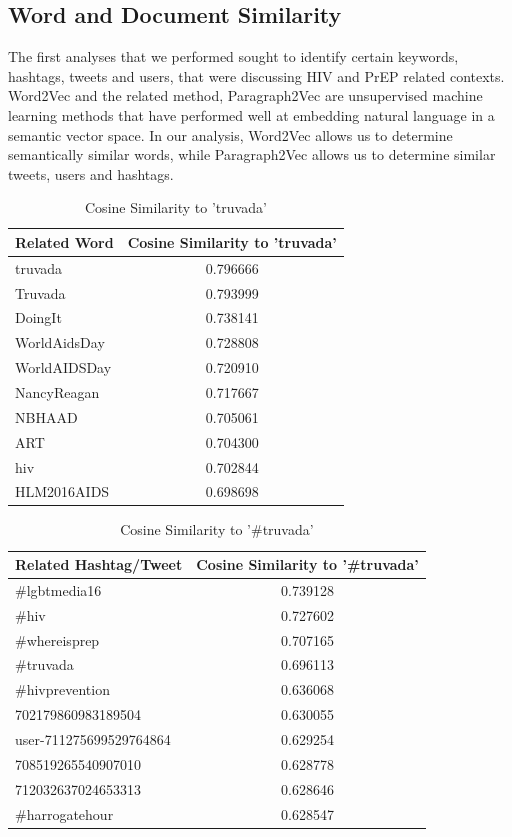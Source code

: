 \documentclass{sig-alternate-05-2015}
\begin{document}
\subsection{Word and Document Similarity}



The first analyses that we performed sought to identify certain keywords, hashtags, tweets and users, that were discussing HIV and PrEP related contexts. Word2Vec and the related method, Paragraph2Vec are unsupervised machine learning methods that have performed well at embedding natural language in a semantic vector space. In our analysis, Word2Vec allows us to determine semantically similar words, while Paragraph2Vec allows us to determine similar tweets, users and hashtags.



\begin{table}
\centering
\caption{Cosine Similarity to 'truvada'}
\begin{tabular}{|l|c|} \hline
Related Word & Cosine Similarity to 'truvada'\\ \hline
truvada & 0.796666\\ \hline
Truvada & 0.793999\\ \hline
DoingIt & 0.738141\\ \hline
WorldAidsDay & 0.728808\\ \hline
WorldAIDSDay & 0.720910\\ \hline
NancyReagan & 0.717667\\ \hline
NBHAAD & 0.705061\\ \hline
ART & 0.704300\\ \hline
hiv & 0.702844\\ \hline
HLM2016AIDS & 0.698698\\ \hline
\hline\end{tabular}
\end{table}

\begin{table}
\centering
\caption{Cosine Similarity to '\#truvada'}
\begin{tabular}{|l|c|} \hline
Related Hashtag/Tweet & Cosine Similarity to '\#truvada'\\ \hline
\#lgbtmedia16 & 0.739128\\ \hline
\#hiv & 0.727602\\ \hline
\#whereisprep & 0.707165\\ \hline
\#truvada & 0.696113\\ \hline
\#hivprevention & 0.636068\\ \hline
702179860983189504 & 0.630055\\ \hline
user-711275699529764864 & 0.629254\\ \hline
708519265540907010 & 0.628778\\ \hline
712032637024653313 & 0.628646\\ \hline
\#harrogatehour & 	0.628547\\ \hline
\hline\end{tabular}
\end{table}
\end{document}
